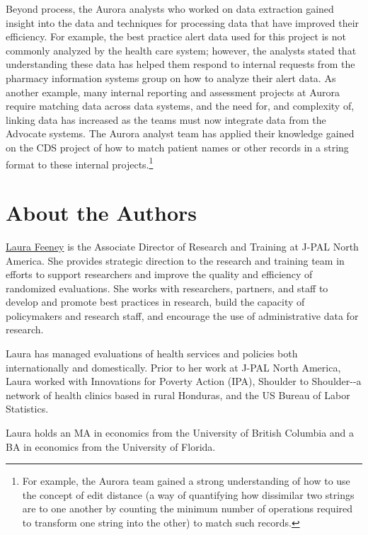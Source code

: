Beyond process, the Aurora analysts who worked on data extraction gained insight into the data and techniques for processing data that have improved their efficiency. For example, the best practice alert data used for this project is not commonly analyzed by the health care system; however, the analysts stated that understanding these data has helped them respond to internal requests from the pharmacy information systems group on how to analyze their alert data. As another example, many internal reporting and assessment projects at Aurora require matching data across data systems, and the need for, and complexity of, linking data has increased as the teams must now integrate data from the Advocate systems. The Aurora analyst team has applied their knowledge gained on the CDS project of how to match patient names or other records in a string format to these internal projects.\footnote{For example, the Aurora team gained a strong understanding of how to use the concept of edit distance (a way of quantifying how dissimilar two strings are to one another by counting the minimum number of operations required to transform one string into the other) to match such records.}

\hypertarget{about-the-authors-5}{%
\section*{About the Authors}\label{about-the-authors-5}}

\href{https://www.povertyactionlab.org/person/feeney}{Laura Feeney} is the Associate Director of Research and Training at J-PAL North America. She provides strategic direction to the research and training team in efforts to support researchers and improve the quality and efficiency of randomized evaluations. She works with researchers, partners, and staff to develop and promote best practices in research, build the capacity of policymakers and research staff, and encourage the use of administrative data for research.

Laura has managed evaluations of health services and policies both internationally and domestically. Prior to her work at J-PAL North America, Laura worked with Innovations for Poverty Action (IPA), Shoulder to Shoulder-\/-a network of health clinics based in rural Honduras, and the US Bureau of Labor Statistics.

Laura holds an MA in economics from the University of British Columbia and a BA in economics from the University of Florida.

